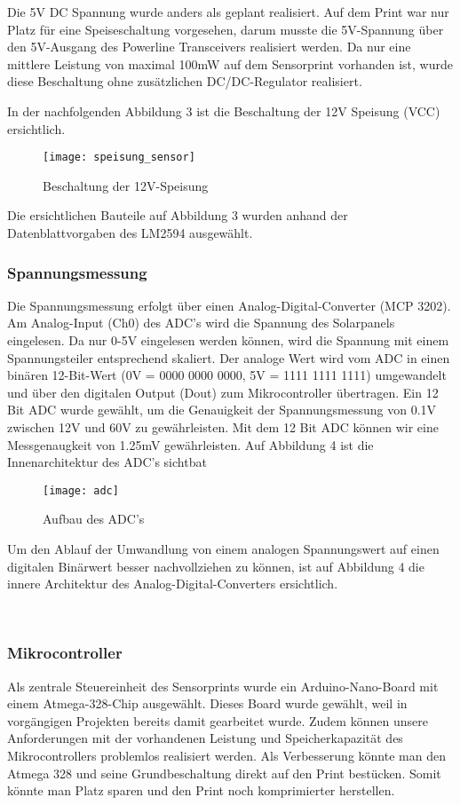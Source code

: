 Die 5V DC Spannung wurde anders als geplant realisiert. Auf dem Print war nur Platz für eine Speiseschaltung vorgesehen, darum musste die 5V-Spannung über den 5V-Ausgang des Powerline Transceivers realisiert werden. Da nur eine mittlere Leistung von maximal 100mW auf dem Sensorprint vorhanden ist, wurde diese Beschaltung ohne zusätzlichen DC/DC-Regulator realisiert.

In der nachfolgenden Abbildung 3 ist die Beschaltung der 12V Speisung (VCC) ersichtlich.


\begin{figure}[h]
\centering
\texttt{[image: speisung\_sensor]}
\caption{Beschaltung der 12V-Speisung}
\end{figure}

Die ersichtlichen Bauteile auf Abbildung 3 wurden anhand der Datenblattvorgaben des LM2594 \cite{DCDC_Regulator_LM2594} ausgewählt.

\clearpage
\subsubsection{Spannungsmessung}
Die Spannungsmessung erfolgt über einen Analog-Digital-Converter (MCP 3202). Am Analog-Input (Ch0) des ADC's wird die Spannung des Solarpanels eingelesen. Da nur 0-5V eingelesen werden können, wird die Spannung mit einem Spannungsteiler entsprechend skaliert. Der analoge Wert wird vom ADC in einen binären 12-Bit-Wert (0V = 0000 0000 0000, 5V = 1111 1111 1111) umgewandelt und über den digitalen Output (Dout) zum Mikrocontroller übertragen. Ein 12 Bit ADC wurde gewählt, um die Genauigkeit der Spannungsmessung von 0.1V zwischen 12V und 60V zu gewährleisten. Mit dem 12 Bit ADC können wir eine Messgenaugkeit von 1.25mV gewährleisten. Auf Abbildung 4 ist die Innenarchitektur des ADC's sichtbat

\begin{figure}[h]
\centering
\texttt{[image: adc]}
\caption{Aufbau des ADC's \cite{Datasheet_adc}}
\end{figure}

Um den Ablauf der Umwandlung von einem analogen Spannungswert auf einen digitalen Binärwert besser nachvollziehen zu können, ist auf Abbildung 4 die innere Architektur des Analog-Digital-Converters ersichtlich.

\
\

\subsubsection{Mikrocontroller}
Als zentrale Steuereinheit des Sensorprints wurde ein Arduino-Nano-Board mit einem Atmega-328-Chip ausgewählt. Dieses Board wurde gewählt, weil in vorgängigen Projekten bereits damit gearbeitet wurde. Zudem können unsere Anforderungen mit der vorhandenen Leistung und Speicherkapazität des Mikrocontrollers problemlos realisiert werden. Als Verbesserung könnte man den Atmega 328 und seine Grundbeschaltung direkt auf den Print bestücken. Somit könnte man Platz sparen und den Print noch komprimierter herstellen.

